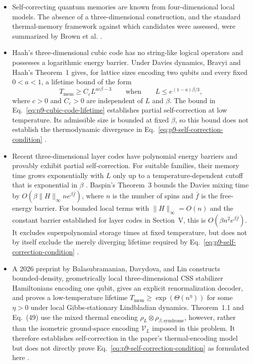 \begin{itemize}
  \item Self-correcting quantum memories are known from four-dimensional
  local models.  The absence of a three-dimensional construction, and the
  standard thermal-memory framework against which candidates were assessed,
  were summarized by Brown et al.
  .

  \item Haah's three-dimensional cubic code has no string-like logical
  operators and possesses a logarithmic energy barrier.  Under Davies
  dynamics, Bravyi and Haah's Theorem~1 gives, for lattice sizes encoding
  two qubits and every fixed $0<a<1$, a lifetime bound of the form
  \begin{equation}
    T_{\mathrm{mem}}\ge C_{\varepsilon}L^{ac\beta-3}
    \qquad\text{when}\qquad
    L\le e^{(1-a)\beta/3},
    \label{eq:p9-cubic-code-lifetime}
  \end{equation}
  where $c>0$ and $C_{\varepsilon}>0$ are independent of $L$ and $\beta$.
  The bound in Eq.~\eqref{eq:p9-cubic-code-lifetime} establishes partial
  self-correction at low temperature.  Its admissible size is bounded at
  fixed $\beta$, so this bound does not establish the thermodynamic
  divergence in Eq.~\eqref{eq:p9-self-correction-condition}
  .

  \item Recent three-dimensional layer codes have polynomial energy barriers
  and provably exhibit partial self-correction.  For suitable families, their
  memory time grows exponentially with $L$ only up to a temperature-dependent
  cutoff that is exponential in $\beta$
  .  Baspin's Theorem~3 bounds the Davies
  mixing time by $O(\beta\lVert H\rVert_{\infty}n e^{\beta\bar f})$, where
  $n$ is the number of spins and $\bar f$ is the free-energy barrier.
  For bounded local terms with $\lVert H\rVert_{\infty}=O(n)$ and the
  constant barrier established for layer codes in Section~V, this is
  $O(\beta n^2e^{\beta\bar f})$.  It excludes superpolynomial storage times
  at fixed temperature, but does not by itself exclude the merely diverging
  lifetime required by Eq.~\eqref{eq:p9-self-correction-condition}
  .

  \item A 2026 preprint by Balasubramanian, Davydova, and Lin constructs
  bounded-density, geometrically local three-dimensional CSS stabilizer
  Hamiltonians encoding one qubit, gives an explicit renormalization decoder,
  and proves a low-temperature lifetime
  $T_{\mathrm{mem}}\ge\exp(\Theta(n^\eta))$ for some $\eta>0$ under local
  Gibbs-stationary Lindbladian dynamics.  Theorem~1.1 and Eq.~(49) use the mixed thermal
  encoding $\rho_L\otimes\rho_{\beta,\mathrm{syndrome}}$, however, rather than
  the isometric ground-space encoding $\mathcal V_L$ imposed in this problem.
  It therefore establishes self-correction in the paper's thermal-encoding
  model but does not directly prove
  Eq.~\eqref{eq:p9-self-correction-condition} as formulated here
  .


\end{itemize}
